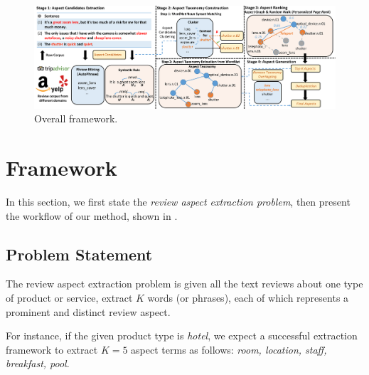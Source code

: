 \begin{figure}[th!]
	\centering
	\includegraphics[width=\textwidth]{figures/framework-extra}
	\caption{Overall framework.}
	\label{fig:framework}
\end{figure}
\section{Framework}
\label{sec:method}
In this section, we first state the \textit{review aspect extraction problem}, 
then present the workflow of our method, shown in .

\subsection{Problem Statement}
\label{sec:problem}
The review aspect extraction problem is given all the text reviews about
one type of product or service, extract $K$ words (or phrases), 
each of which represents a prominent and distinct review aspect. 

For instance, if the given product type is \textit{hotel}, 
we expect a successful extraction framework to extract 
$K=5$ aspect terms as follows: 
\textit{room, location, staff, breakfast, pool}.

